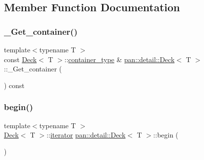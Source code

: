 \subsection{Member Function Documentation}
\mbox{\label{classpan_1_1detail_1_1_deck_a7ab128dae3cf7c12cda581a129163948}} 
\subsubsection{\texorpdfstring{\+\_\+\+Get\+\_\+container()}{\_Get\_container()}}
{\footnotesize\ttfamily template$<$typename T $>$ \\
const \hyperlink{classpan_1_1detail_1_1_deck}{Deck}$<$ T $>$\+::\hyperlink{classpan_1_1detail_1_1_deck_a847d973e0469dd7aef881b3863c37cff}{container\+\_\+type} \& \hyperlink{classpan_1_1detail_1_1_deck}{pan\+::detail\+::\+Deck}$<$ T $>$\+::\+\_\+\+Get\+\_\+container (\begin{DoxyParamCaption}{ }\end{DoxyParamCaption}) const\hspace{0.3cm}{\ttfamily [inline]}}

\mbox{\label{classpan_1_1detail_1_1_deck_a32ce67b19c19b9760a939197f32bdbd7}} 
\subsubsection{\texorpdfstring{begin()}{begin()}\hspace{0.1cm}{\footnotesize\ttfamily [1/2]}}
{\footnotesize\ttfamily template$<$typename T $>$ \\
\hyperlink{classpan_1_1detail_1_1_deck}{Deck}$<$ T $>$\+::\hyperlink{classpan_1_1detail_1_1_deck_a8b4adeae73d035d2bbe3fdfcb65ed1b1}{iterator} \hyperlink{classpan_1_1detail_1_1_deck}{pan\+::detail\+::\+Deck}$<$ T $>$\+::begin (\begin{DoxyParamCaption}{ }\end{DoxyParamCaption})\hspace{0.3cm}{\ttfamily [inline]}}

\mbox{\label{classpan_1_1detail_1_1_deck_aa2a28d431e67eb803c7812e8893c1fdf}} 

